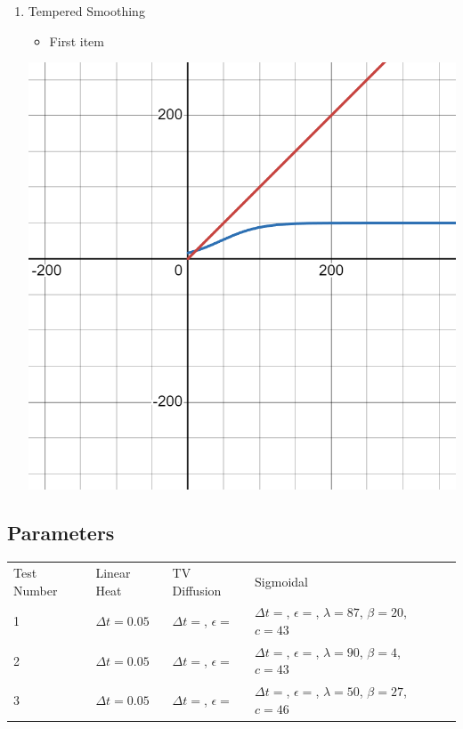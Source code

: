 \documentclass{article}
\begin{document}
\begin{enumerate}
    \item Tempered Smoothing
      \begin{itemize}
        \item First item
      \end{itemize}
      \includegraphics[scale=0.1]{../report_images/tempered_smoothing.png}

  \end{enumerate}



  \subsection{Parameters}
    \begin{table}[h]
      \begin{tabular}{|l|l|l|l|l}
      \cline{1-4}
      Test Number & Linear Heat & TV Diffusion & Sigmoidal &  \\ \cline{1-4}
      1           & $\Delta t = 0.05 $      & $\Delta t =$, $\epsilon =$     & $\Delta t =$, $\epsilon =$, $\lambda = 87$,  $\beta = 20$, $c= 43$ &  \\ \cline{1-4}
      2           & $\Delta t = 0.05 $      & $\Delta t =$, $\epsilon =$     & $\Delta t =$, $\epsilon =$, $\lambda = 90$,  $\beta = 4$,~  $c= 43$ &  \\ \cline{1-4}
      3           & $\Delta t = 0.05 $      & $\Delta t =$, $\epsilon =$     & $\Delta t =$, $\epsilon =$, $\lambda = 50$,  $\beta = 27$, $c= 46$ &  \\ \cline{1-4}
      \end{tabular}
    \end{table}
  
\end{document}
